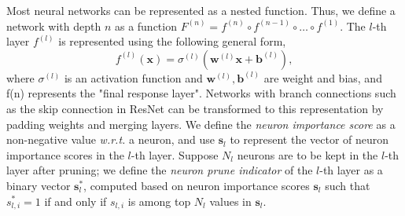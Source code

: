 \documentclass[10pt,twocolumn,letterpaper]{article}
\newtheorem{definition}[theorem]{Definition}
\def\mb{\mathbf}
\def\wrt{\emph{w.r.t.} }
\begin{document}
Most neural networks can be represented as a nested function. Thus, we define a network with depth $n$ as a function $F^{(n)}=f^{(n)}\circ f^{(n-1)}\circ\dots\circ f^{(1)}$. The $l$-th layer $f^{(l)}$ is represented using the following general form,
\begin{equation}
\label{proof1_objective_2}
f^{(l)}(\mb x)=\sigma^{(l)}(\mb w^{(l)}\mb x+\mathbf b^{(l)}),
\end{equation}
where $\sigma^{(l)}$ is an activation function and $\mb w^{(l)},\mb b^{(l)}$ are weight and bias, and f(n) represents the "final response layer".
Networks with branch connections such as the skip connection in ResNet can be transformed to this representation by padding weights and merging layers. %
We define the \textit{neuron importance score} as a non-negative value \wrt a neuron, and use $\mb s_l$ to represent the vector of neuron importance scores  in the $l$-th layer. Suppose $N_l$ neurons are to be kept in the $l$-th layer after pruning; we define the \textit{neuron prune indicator} of the $l$-th layer as a binary vector $\mb s^*_l$, computed based on neuron importance scores $\mb s_l$ such that $s^*_{l,i}=1$ if and only if $s_{l,i}$ is among top $N_l$ values in $\mb s_l$. 
\end{document}
